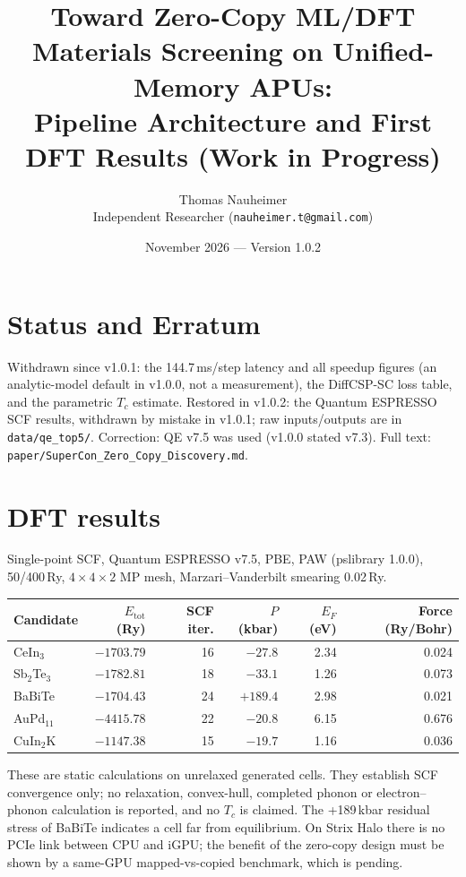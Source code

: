 \documentclass[11pt,a4paper]{article}
\title{\textbf{Toward Zero-Copy ML/DFT Materials Screening on Unified-Memory APUs:\\Pipeline Architecture and First DFT Results (Work in Progress)}}
\author{Thomas Nauheimer\\Independent Researcher (\texttt{nauheimer.t@gmail.com})}
\date{November 2026 --- Version 1.0.2}
\begin{document}
\maketitle

\section*{Status and Erratum}
Withdrawn since v1.0.1: the 144.7\,ms/step latency and all speedup figures (an analytic-model default in v1.0.0, not a measurement), the DiffCSP-SC loss table, and the parametric $T_c$ estimate. Restored in v1.0.2: the Quantum ESPRESSO SCF results, withdrawn by mistake in v1.0.1; raw inputs/outputs are in \texttt{data/qe\_top5/}. Correction: QE v7.5 was used (v1.0.0 stated v7.3). Full text: \texttt{paper/SuperCon\_Zero\_Copy\_Discovery.md}.

\section*{DFT results}
Single-point SCF, Quantum ESPRESSO v7.5, PBE, PAW (pslibrary 1.0.0), 50/400\,Ry, $4\times4\times2$ MP mesh, Marzari--Vanderbilt smearing 0.02\,Ry.

\begin{center}
\begin{tabular}{lrrrrr}
\toprule
Candidate & $E_{\mathrm{tot}}$ (Ry) & SCF iter. & $P$ (kbar) & $E_F$ (eV) & Force (Ry/Bohr) \\
\midrule
CeIn$_3$ & $-1703.79$ & 16 & $-27.8$ & 2.34 & 0.024 \\
Sb$_2$Te$_3$ & $-1782.81$ & 18 & $-33.1$ & 1.26 & 0.073 \\
BaBiTe & $-1704.43$ & 24 & $+189.4$ & 2.98 & 0.021 \\
AuPd$_{11}$ & $-4415.78$ & 22 & $-20.8$ & 6.15 & 0.676 \\
CuIn$_2$K & $-1147.38$ & 15 & $-19.7$ & 1.16 & 0.036 \\
\bottomrule
\end{tabular}
\end{center}

These are static calculations on unrelaxed generated cells. They establish SCF convergence only; no relaxation, convex-hull, completed phonon or electron--phonon calculation is reported, and no $T_c$ is claimed. The +189\,kbar residual stress of BaBiTe indicates a cell far from equilibrium. On Strix Halo there is no PCIe link between CPU and iGPU; the benefit of the zero-copy design must be shown by a same-GPU mapped-vs-copied benchmark, which is pending.
\end{document}
